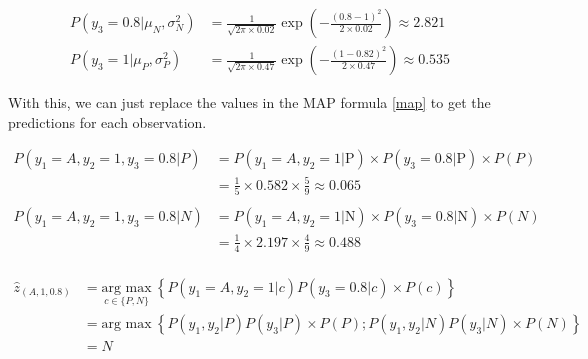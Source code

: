 \documentclass[12pt]{article}
\begin{document}
\begin{enumerate}[leftmargin=\labelsep]
    \begin{equation*}
        \begin{aligned}
            P(y_3 = 0.8|\mu_N, \sigma_N^2) &= \frac{1}{\sqrt{2\pi \times 0.02}} \exp\left(-\frac{(0.8 - 1)^2}{2 \times 0.02}\right) \approx 2.821\\
            P(y_3 = 1|\mu_P, \sigma_P^2) &= \frac{1}{\sqrt{2\pi \times 0.47}} \exp\left(-\frac{(1 - 0.82)^2}{2 \times 0.47}\right) \approx 0.535
        \end{aligned}
    \end{equation*}

    \vspace{10pt}
    With this, we can just replace the values in the MAP formula \eqref{map} to get the predictions for each observation.

    \vspace{10pt}
    \begin{equation*}
        \begin{aligned}
        P(y_1 = A, y_2 = 1, y_3 = 0.8 | P) &= P(y_1 = A, y_2 = 1 | \text{P}) \times P(y_3 = 0.8 | \text{P}) \times P(P) \\
        &= \frac{1}{5} \times 0.582 \times \frac{5}{9} \approx 0.065\\
        \\
        P(y_1 = A, y_2 = 1, y_3 = 0.8 | N) &= P(y_1 = A, y_2 = 1 | \text{N}) \times P(y_3 = 0.8 | \text{N}) \times P(N) \\
        &= \frac{1}{4} \times 2.197 \times \frac{4}{9} \approx 0.488\\
        \end{aligned}
    \end{equation*}

    \begin{equation*}
    \begin{aligned}
        \hat{z}_{(A, 1, 0.8)} &= \underset{c \in \{P,N\}}{\text{arg max}} \medspace \left\{P(y_1 = A, y_2 = 1 | c) P(y_3 = 0.8| c) \times P(c)\right\}\\
                    & = \text{arg max} \medspace \left\{P(y_1, y_2 | P) P(y_3| P) \times P(P); P(y_1, y_2 | N) P(y_3| N) \times P(N)\right\} \\
                    & = N
    \end{aligned}
    \end{equation*}


\end{enumerate}
\end{document}
